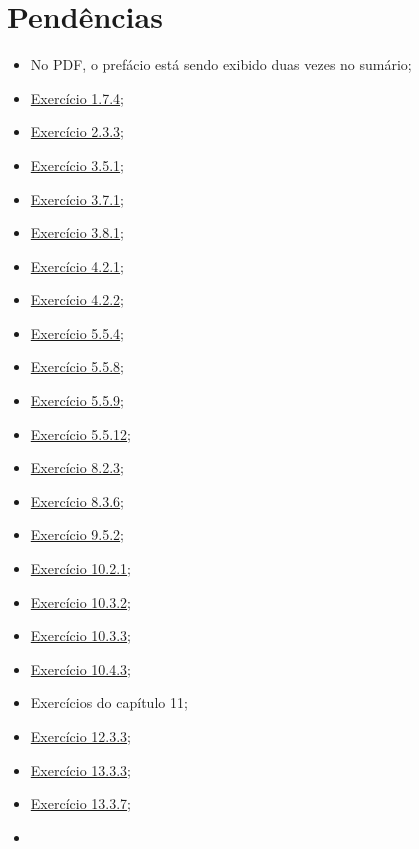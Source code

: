 \documentclass[
]{latex/krantz}
\providecommand{\tightlist}{%
  \setlength{\itemsep}{0pt}\setlength{\parskip}{0pt}}
\theoremstyle{definition}
\theoremstyle{definition}
\theoremstyle{definition}
\theoremstyle{definition}
\theoremstyle{remark}
\begin{document}
\hypertarget{penduxeancias}{%
\section*{Pendências}\label{penduxeancias}}

\begin{itemize}
\tightlist
\item
  No PDF, o prefácio está sendo exibido duas vezes no sumário;
\item
  \protect\hyperlink{exr1-7-4}{Exercício 1.7.4};
\item
  \protect\hyperlink{exr2-3-3}{Exercício 2.3.3};
\item
  \protect\hyperlink{exr3-5-1}{Exercício 3.5.1};
\item
  \protect\hyperlink{exr3-7-1}{Exercício 3.7.1};
\item
  \protect\hyperlink{exr3-8-1}{Exercício 3.8.1};
\item
  \protect\hyperlink{exr4-2-1}{Exercício 4.2.1};
\item
  \protect\hyperlink{exr4-2-2}{Exercício 4.2.2};
\item
  \protect\hyperlink{exr5-5-4}{Exercício 5.5.4};
\item
  \protect\hyperlink{exr5-5-8}{Exercício 5.5.8};
\item
  \protect\hyperlink{exr5-5-9}{Exercício 5.5.9};
\item
  \protect\hyperlink{exr5-5-12}{Exercício 5.5.12};
\item
  \protect\hyperlink{exr8-2-3}{Exercício 8.2.3};
\item
  \protect\hyperlink{exr8-3-6}{Exercício 8.3.6};
\item
  \protect\hyperlink{exr9-5-2}{Exercício 9.5.2};
\item
  \protect\hyperlink{exr10-2-1}{Exercício 10.2.1};
\item
  \protect\hyperlink{exr10-3-2}{Exercício 10.3.2};
\item
  \protect\hyperlink{exr10-3-3}{Exercício 10.3.3};
\item
  \protect\hyperlink{exr10-4-3}{Exercício 10.4.3};
\item
  Exercícios do capítulo 11;
\item
  \protect\hyperlink{exr12-3-3}{Exercício 12.3.3};
\item
  \protect\hyperlink{exr13-3-3}{Exercício 13.3.3};
\item
  \protect\hyperlink{exr13-3-7}{Exercício 13.3.7};
\item
\end{itemize}
\end{document}
